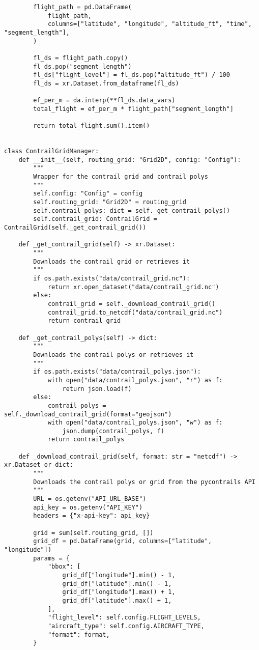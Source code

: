 \begin{verbatim}
        flight_path = pd.DataFrame(
            flight_path,
            columns=["latitude", "longitude", "altitude_ft", "time", "segment_length"],
        )

        fl_ds = flight_path.copy()
        fl_ds.pop("segment_length")
        fl_ds["flight_level"] = fl_ds.pop("altitude_ft") / 100
        fl_ds = xr.Dataset.from_dataframe(fl_ds)

        ef_per_m = da.interp(**fl_ds.data_vars)
        total_flight = ef_per_m * flight_path["segment_length"]

        return total_flight.sum().item()


class ContrailGridManager:
    def __init__(self, routing_grid: "Grid2D", config: "Config"):
        """
        Wrapper for the contrail grid and contrail polys
        """
        self.config: "Config" = config
        self.routing_grid: "Grid2D" = routing_grid
        self.contrail_polys: dict = self._get_contrail_polys()
        self.contrail_grid: ContrailGrid = ContrailGrid(self._get_contrail_grid())

    def _get_contrail_grid(self) -> xr.Dataset:
        """
        Downloads the contrail grid or retrieves it
        """
        if os.path.exists("data/contrail_grid.nc"):
            return xr.open_dataset("data/contrail_grid.nc")
        else:
            contrail_grid = self._download_contrail_grid()
            contrail_grid.to_netcdf("data/contrail_grid.nc")
            return contrail_grid

    def _get_contrail_polys(self) -> dict:
        """
        Downloads the contrail polys or retrieves it
        """
        if os.path.exists("data/contrail_polys.json"):
            with open("data/contrail_polys.json", "r") as f:
                return json.load(f)
        else:
            contrail_polys = self._download_contrail_grid(format="geojson")
            with open("data/contrail_polys.json", "w") as f:
                json.dump(contrail_polys, f)
            return contrail_polys

    def _download_contrail_grid(self, format: str = "netcdf") -> xr.Dataset or dict:
        """
        Downloads the contrail polys or grid from the pycontrails API
        """
        URL = os.getenv("API_URL_BASE")
        api_key = os.getenv("API_KEY")
        headers = {"x-api-key": api_key}

        grid = sum(self.routing_grid, [])
        grid_df = pd.DataFrame(grid, columns=["latitude", "longitude"])
        params = {
            "bbox": [
                grid_df["longitude"].min() - 1,
                grid_df["latitude"].min() - 1,
                grid_df["longitude"].max() + 1,
                grid_df["latitude"].max() + 1,
            ],
            "flight_level": self.config.FLIGHT_LEVELS,
            "aircraft_type": self.config.AIRCRAFT_TYPE,
            "format": format,
        }


\end{verbatim}
